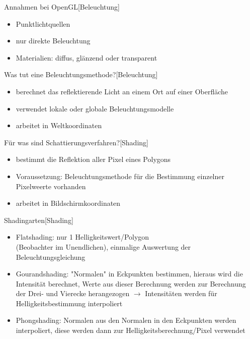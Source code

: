 \documentclass[a7paper,print]{kartei}
\begin{document}
\begin{karte}[CGIS]{Annahmen bei OpenGL}[Beleuchtung]
\begin{itemize}
\item Punktlichtquellen
\item nur direkte Beleuchtung
\item Materialien: diffus, glänzend oder transparent
\end{itemize}
\end{karte}

\begin{karte}[CGIS]{Was tut eine Beleuchtungsmethode?}[Beleuchtung]
\begin{itemize}
\item berechnet das reflektierende Licht an einem Ort auf einer Oberfläche
\item verwendet lokale oder globale Beleuchtungsmodelle
\item arbeitet in Weltkoordinaten
\end{itemize}
\end{karte}

\begin{karte}[CGIS]{Für was sind Schattierungsverfahren?}[Shading]
\begin{itemize}
\item bestimmt die Reflektion aller Pixel eines Polygons
\item Voraussetzung: Beleuchtungsmethode für die Bestimmung einzelner Pixelweerte vorhanden
\item arbeitet in Bildschirmkoordinaten
\end{itemize}
\end{karte}

\begin{karte}[CGIS]{Shadingarten}[Shading]
\begin{itemize}
\item Flatshading: nur 1 Helligkeitswert/Polygon \\(Beobachter im Unendlichen), einmalige Auswertung der Beleuchtungsgleichung
\item Gourandshading: \scriptsize{"Normalen" in Eckpunkten bestimmen, hieraus wird die Intensität berechnet, Werte aus dieser Berechnung werden zur Berechnung der Drei- und Vierecke herangezogen $\rightarrow$ Intensitäten werden für Helligkeitsbestimmung interpoliert}
\item \normalsize Phongshading: Normalen aus den Normalen in den Eckpunkten werden interpoliert, diese werden dann zur Helligkeitsberechnung/Pixel verwendet
\end{itemize}
\end{karte}
\end{document}
